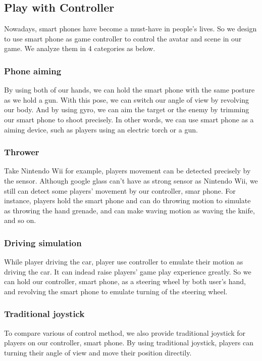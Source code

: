 \documentclass{sigchi}
\begin{document}
\subsection{Play with Controller}
Nowadays, smart phones have become a must-have in people's lives. So we design to use smart phone as game controller to control the avatar and scene in our game. We analyze them in 4 categories as below.

\subsubsection{Phone aiming}
By using both of our hands, we can hold the smart phone with the same posture as we hold a gun. With this pose, we can switch our angle of view by revolving our body. And by using gyro, we can aim the target or the enemy by trimming our smart phone to shoot precisely. In other words, we can use smart phone as a aiming device, such as players using an electric torch or a gun.

\subsubsection{Thrower}
Take Nintendo Wii for example, players movement can be detected precisely by the sensor. Although google glass can't have as strong sensor as Nintendo Wii, we still can detect some players' movement by our controller, smar phone. For instance, players hold the smart phone and can do throwing motion to simulate as throwing the hand grenade, and can make waving motion as waving the knife, and so on.

\subsubsection{Driving simulation}
While player driving the car, player use controller to emulate their motion as driving the car. It can indead raise players' game play experience greatly. So we can hold our controller, smart phone, as a steering wheel by both user's hand, and revolving the smart phone to emulate turning of the steering wheel.

\subsubsection{Traditional joystick}
To compare various of control method, we also provide traditional joystick for players on our controller, smart phone. By using traditional joystick, players can turning their angle of view and move their position directily.
\end{document}
